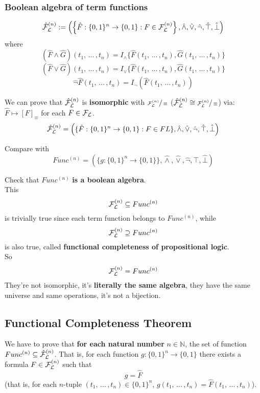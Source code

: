 \documentclass[11pt]{article}
\begin{document}
	\newpage
	
	\subsubsection{Boolean algebra of term functions}
	
	$$ \hat{\mathcal{F}}_\mathcal{L}^{(n)} := \left( \left\{\hat F: \{0,1\}^n \rightarrow \{0,1\}: F \in \mathcal{F}_\mathcal{L}^{(n)} \right\}, \hat \wedge, \hat \vee, \hat \neg, \hat \top, \hat \bot \right)$$
	where 
	$$ (\hat F \wedge \hat G) (t_1, \, ... \, , t_n) = I_\wedge \{\hat F (t_1, \, ... \, , t_n), \hat G (t_1, \, ... \, , t_n)\}$$
	$$ (\hat F \vee \hat G) (t_1, \, ... \, , t_n) = I_\vee \{\hat F (t_1, \, ... \, , t_n), \hat G (t_1, \, ... \, , t_n)\}$$
	$$ \hat \neg \hat F (t_1, \, ... \, , t_n) = I_\neg (\hat F (t_1, \, ... \, , t_n)) $$
	
	We can prove that $\hat{\mathcal{F}}_\mathcal{L}^{(n)}$ is \textbf{isomorphic} with $\sfrac{\mathcal{F}_\mathcal{L}^{(n)}}{\equiv}$ ($\hat{\mathcal{F}}_\mathcal{L}^{(n)} \cong \sfrac{\mathcal{F}_\mathcal{L}^{(n)}}{\equiv}$) via: $\hat F \mapsto [F]_\equiv$ for each $F \in \mathcal{F}_\mathcal{L}$.\\
	
	$$\hat{\mathcal{F}}_\mathcal{L}^{(n)} = \left(\{ \hat F: \{0,1\}^n \rightarrow \{0,1\}: F \in FL\}, \hat \wedge, \hat \vee, \hat \neg, \hat \top, \hat \bot \right)$$
	
	Compare with
	$$ Func^{(n)} = \left(\{ g: \{0,1\}^n \rightarrow \{0,1\} \}, \hat \wedge, \hat \vee, \hat \neg, \hat \top, \hat \bot \right)$$
	
	Check that $Func^{(n)}$ \textbf{is a boolean algebra}.\\
	
	This
	$$ \mathcal{F}_\mathcal{L}^{(n)} \subseteq Func^{(n)}$$
	is trivially true since each term function belongs to $Func^{(n)}$, while
	$$ \mathcal{F}_\mathcal{L}^{(n)} \supseteq Func^{(n)}$$
	is also true, called \textbf{functional completeness of propositional logic}.\\
	
	So
	$$ \mathcal{F}_\mathcal{L}^{(n)} = Func^{(n)} $$
	They're not isomorphic, it's \textbf{literally the same algebra}, they have the same universe and same operations, it's not a bijection.
	
	\newpage
	
	\subsection{Functional Completeness Theorem}
	
	We have to prove that \textbf{for each natural number} $n \in \mathbb{N}$, the set of function $Func^{(n)} \subseteq \hat{\mathcal{F}}_\mathcal{L}^{(n)}$. That is, for each function $g: \{0,1\}^n \rightarrow \{0,1\}$ there exists a formula $F \in \mathcal{F}_\mathcal{L}^{(n)}$ such that 
	$$ g = \hat F$$
	(that is, for each $n$-tuple $(t_1, \, ... \, , t_n) \in \{0,1\}^n$, $g (t_1, \, ... \, , t_n) = \hat F (t_1, \, ... \, , t_n)$).\\
	
\end{document}
